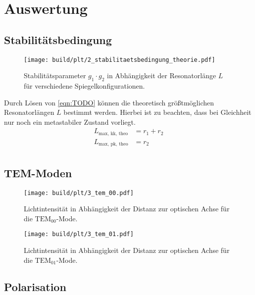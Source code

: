 \section{Auswertung}
\label{sec:auswertung}

\subsection{Stabilitätsbedingung}
\lipsum[1]

\begin{figure}
  \centering
   \texttt{[image: build/plt/2\_stabilitaetsbedingung\_theorie.pdf]}
   \caption{Stabilitätsparameter $g_1 \cdot g_2$ in Abhängigkeit der Resonatorlänge $L$ für verschiedene Spiegelkonfigurationen.}
   \label{fig:plt:stabilitaetsbedingung_theorie}
\end{figure}

Durch Lösen von \autoref{eqn:TODO} können die theoretisch größtmöglichen Resonatorlängen $L$ bestimmt werden.
Hierbei ist zu beachten, dass bei Gleichheit nur noch ein metastabiler Zustand vorliegt.
\begin{align*}
    L_\text{max, kk, theo} &= r_1 + r_2 \\
    L_\text{max, pk, theo} &= r_2 \\
\end{align*}


\subsection{TEM-Moden}
\lipsum[1]

\begin{figure}
  \centering
   \texttt{[image: build/plt/3\_tem\_00.pdf]}
   \caption{Lichtintensität in Abhängigkeit der Distanz zur optischen Achse für die $\text{TEM}_{00}$-Mode.}
   \label{fig:plt:tem_00}
\end{figure}

\begin{figure}
  \centering
   \texttt{[image: build/plt/3\_tem\_01.pdf]}
   \caption{Lichtintensität in Abhängigkeit der Distanz zur optischen Achse für die $\text{TEM}_{01}$-Mode.}
   \label{fig:plt:tem_01}
\end{figure}


\subsection{Polarisation}
\lipsum[1]

